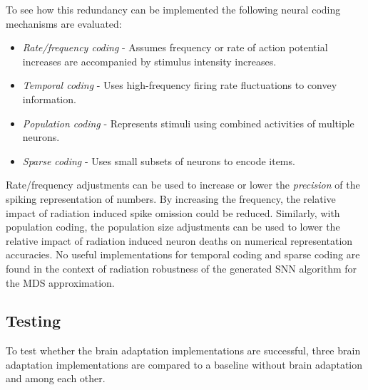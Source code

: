 To see how this redundancy can be implemented the following neural coding mechanisms are evaluated:
\begin{itemize}
    \item \textit{Rate/frequency coding} - Assumes frequency or rate of action potential increases are accompanied by stimulus intensity increases.
    \item \textit{Temporal coding} - Uses high-frequency firing rate fluctuations to convey information. %
    \item \textit{Population coding} - Represents stimuli using combined activities of multiple neurons.%
    \item \textit{Sparse coding} - Uses small subsets of neurons to encode items. %
\end{itemize}
Rate/frequency adjustments can be used to increase or lower the \textit{precision} %
of the spiking representation of numbers. By increasing the frequency, the relative impact of radiation induced spike omission could be reduced. %
Similarly, with population coding, the population size adjustments can be used to lower the relative impact of radiation induced neuron deaths on numerical representation accuracies. No useful implementations for temporal coding and sparse coding are found in the context of radiation robustness of the generated SNN algorithm for the MDS approximation.

\subsection{Testing}\label{subsec:testing}
To test whether the brain adaptation implementations are successful, three brain adaptation implementations are compared to a baseline without brain adaptation and among each other. 

